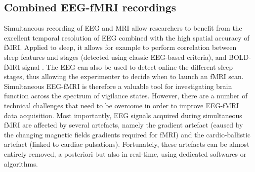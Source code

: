 \subsection{Combined EEG-fMRI recordings}
\label{sec:fmri:rs:eeg-fmri}

Simultaneous recording of EEG and MRI allow researchers to benefit from the excellent temporal resolution of EEG combined with the high spatial accuracy of fMRI. Applied to sleep, it allows for example to perform correlation between sleep features and stages (detected using classic EEG-based criteria), and BOLD-fMRI signal \citep{duyn_eeg-fmri_2012}. The EEG can also be used to detect online the different sleep stages, thus allowing the experimenter to decide when to launch an fMRI scan. Simultaneous EEG-fMRI is therefore a valuable tool for investigating brain function across the spectrum of vigilance states.
However, there are a number of technical challenges that need to be overcome in order to improve EEG-fMRI data acquisition. Most importantly, EEG signals acquired during simultaneous fMRI are affected by several artefacts, namely the gradient artefact (caused by the changing magnetic fields gradients required for fMRI) and the cardio-ballistic artefact (linked to cardiac pulsations). Fortunately, these artefacts can be almost entirely removed, a posteriori but also in real-time, using dedicated softwares or algorithms.

